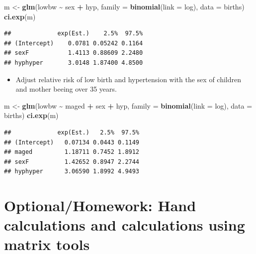 \documentclass[
]{book}
\newenvironment{Shaded}{\begin{snugshade}}{\end{snugshade}}
\newcommand{\AttributeTok}[1]{\textcolor[rgb]{0.13,0.29,0.53}{#1}}
\newcommand{\FunctionTok}[1]{\textcolor[rgb]{0.13,0.29,0.53}{\textbf{#1}}}
\newcommand{\NormalTok}[1]{#1}
\newcommand{\OtherTok}[1]{\textcolor[rgb]{0.56,0.35,0.01}{#1}}
\newcommand{\SpecialCharTok}[1]{\textcolor[rgb]{0.81,0.36,0.00}{\textbf{#1}}}
\providecommand{\tightlist}{%
  \setlength{\itemsep}{0pt}\setlength{\parskip}{0pt}}
\theoremstyle{definition}
\theoremstyle{definition}
\theoremstyle{definition}
\theoremstyle{definition}
\theoremstyle{remark}
\begin{document}
\begin{Shaded}
\begin{Highlighting}[]
\NormalTok{m }\OtherTok{\textless{}{-}} \FunctionTok{glm}\NormalTok{(lowbw }\SpecialCharTok{\textasciitilde{}}\NormalTok{ sex }\SpecialCharTok{+}\NormalTok{ hyp, }\AttributeTok{family =} \FunctionTok{binomial}\NormalTok{(}\AttributeTok{link =}\NormalTok{ log), }\AttributeTok{data =}\NormalTok{ births)}
\FunctionTok{ci.exp}\NormalTok{(m)}
\end{Highlighting}
\end{Shaded}

\begin{verbatim}
##             exp(Est.)    2.5%  97.5%
## (Intercept)    0.0781 0.05242 0.1164
## sexF           1.4113 0.88609 2.2480
## hyphyper       3.0148 1.87400 4.8500
\end{verbatim}

\begin{itemize}
\tightlist
\item
  Adjust relative risk of low birth and hypertension with the sex of children and mother beeing over 35 years.
\end{itemize}

\begin{Shaded}
\begin{Highlighting}[]
\NormalTok{m }\OtherTok{\textless{}{-}} \FunctionTok{glm}\NormalTok{(lowbw }\SpecialCharTok{\textasciitilde{}}\NormalTok{ maged }\SpecialCharTok{+}\NormalTok{ sex }\SpecialCharTok{+}\NormalTok{ hyp, }\AttributeTok{family =} \FunctionTok{binomial}\NormalTok{(}\AttributeTok{link =}\NormalTok{ log), }\AttributeTok{data =}\NormalTok{ births)}
\FunctionTok{ci.exp}\NormalTok{(m)}
\end{Highlighting}
\end{Shaded}

\begin{verbatim}
##             exp(Est.)   2.5%  97.5%
## (Intercept)   0.07134 0.0443 0.1149
## maged         1.18711 0.7452 1.8912
## sexF          1.42652 0.8947 2.2744
## hyphyper      3.06590 1.8992 4.9493
\end{verbatim}

\section{Optional/Homework: Hand calculations and calculations using matrix tools}\label{optionalhomework-hand-calculations-and-calculations-using-matrix-tools}
\end{document}
